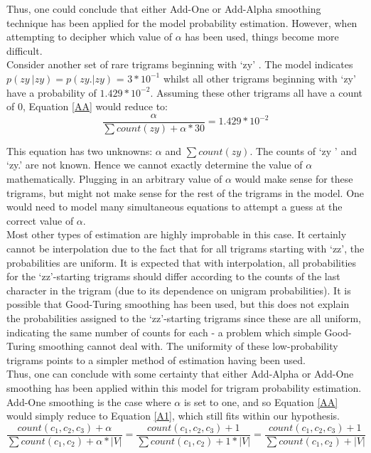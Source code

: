 \documentclass[12pt]{article}
\begin{document}
Thus, one could conclude that either Add-One or Add-Alpha smoothing technique has been applied for the model probability estimation. However, when attempting to decipher which value of $\alpha$ has been used, things become more difficult.\\
\hfill\break
Consider another set of rare trigrams beginning with `zy' . The model indicates $p(zy\ | zy) = p(zy. | zy)$ = $3 * 10^{-1}$ whilst all other trigrams beginning with `zy' have a probability of $1.429 * 10^{-2}$. Assuming these other trigrams all have a count of 0, Equation \ref{AA}  would reduce to:
\[\dfrac{ \alpha} {\sum count(zy)+ \alpha * 30} = 1.429 * 10^{-2}\]

This equation has two unknowns:  $\alpha$ and $\sum count(zy)$. The counts of `zy ' and `zy.' are not known. Hence we cannot exactly determine the value of $\alpha$ mathematically.  Plugging in an arbitrary value of $\alpha$ would make sense for these trigrams, but might not make sense for the rest of the trigrams in the model.  One would need to model many simultaneous equations to attempt a guess at the correct value of $\alpha$. \\
\hfill\break
Most other types of estimation are highly improbable in this case.  It certainly cannot be interpolation due to the fact that for all trigrams starting with `zz', the probabilities are uniform.  It is expected that with interpolation, all probabilities for the `zz'-starting trigrams should differ according to the counts of the last character in the trigram (due to its dependence on unigram probabilities).  It is possible that Good-Turing smoothing has been used, but this does not explain the probabilities assigned to the `zz'-starting trigrams since these are all uniform, indicating the same number of counts for each - a problem which simple Good-Turing smoothing cannot deal with.  The uniformity of these low-probability trigrams points to a simpler method of estimation having been used.\\
\hfill\break
Thus, one can conclude with some certainty that either Add-Alpha or Add-One smoothing has been applied within this model for trigram probability estimation. Add-One smoothing is the case where $\alpha$ is set to one, and so Equation \ref{AA} would simply reduce to Equation \ref{A1}, which still fits within our hypothesis.
\begin{equation}\label{A1}
\dfrac{{count(c_{1},c_{2},c_{3})} + \alpha} {\sum count(c_1,c_2)+ \alpha * |V|} = \dfrac{{count(c_{1},c_{2},c_{3})} + 1} {\sum count(c_1,c_2)+ 1 * |V|}  = \dfrac{{count(c_{1},c_{2},c_{3})} + 1} {\sum count(c_1,c_2)+  |V|}
\end{equation}
\end{document}
